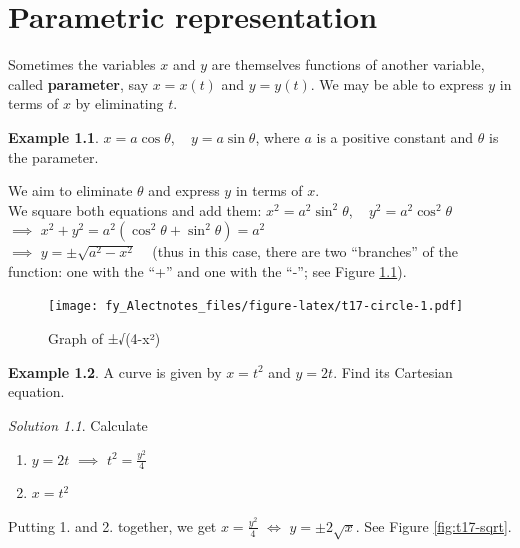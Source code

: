 \documentclass[
  12pt,
  oneside]{book}
\providecommand{\tightlist}{%
  \setlength{\itemsep}{0pt}\setlength{\parskip}{0pt}}
\theoremstyle{definition}
\theoremstyle{definition}
\newtheorem{example}{Example}[chapter]
\theoremstyle{definition}
\theoremstyle{definition}
\theoremstyle{remark}
\newtheorem*{solution}{Solution}
\begin{document}
\hypertarget{parametric-representation}{%
\chapter{Parametric representation}\label{parametric-representation}}

Sometimes the variables \(x\) and \(y\) are themselves functions of another variable, called \textbf{parameter}, say \(x=x(t)\) and \(y=y(t)\). We may be able to express \(y\) in terms of \(x\) by eliminating \(t\).

\begin{example}
\(x=a\cos\theta\), ~ \(y=a\sin\theta\), where \(a\) is a positive constant and \(\theta\) is the parameter.
\end{example}

We aim to eliminate \(\theta\) and express \(y\) in terms of \(x\).\\
We square both equations and add them: \(x^2=a^2\sin^2\theta\), ~ \(y^2=a^2\cos^2\theta\)\\
\(\implies\) \(x^2+y^2=a^2(\cos^2\theta+\sin^2\theta) = a^2\)\\
\(\implies\) \(y=\pm\sqrt{a^2-x^2}\) ~ (thus in this case, there are two ``branches'' of the function: one with the ``+'' and one with the ``-''; see Figure \ref{fig:t17-circle}).

\begin{figure}
\centering
\texttt{[image: fy\_Alectnotes\_files/figure-latex/t17-circle-1.pdf]}
\caption{\label{fig:t17-circle}Graph of ±√(4-x²)}
\end{figure}

\begin{example}
A curve is given by \(x=t^2\) and \(y=2t\). Find its Cartesian equation.
\end{example}

\begin{solution}
Calculate

\begin{enumerate}
\def\labelenumi{\arabic{enumi}.}
\tightlist
\item
  \(y=2t\) \(\implies\) \(t^2=\frac{y^2}{4}\)\\
\item
  \(x=t^2\)
\end{enumerate}

Putting 1. and 2. together, we get \(x=\frac{y^2}{4}\) \(\iff\) \(y=\pm2\sqrt{x}\). See Figure \ref{fig:t17-sqrt}.
\end{solution}
\end{document}

